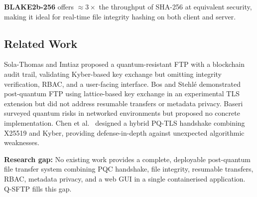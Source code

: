 \textbf{BLAKE2b-256} \cite{aumasson2013blake2} offers $\approx 3\times$
the throughput of SHA-256 at equivalent security, making it ideal for
real-time file integrity hashing on both client and server.

\subsection{Related Work}

Sola-Thomas and Imtiaz \cite{sola2025quantumftp} proposed a
quantum-resistant FTP with a blockchain audit trail, validating
Kyber-based key exchange but omitting integrity verification, RBAC,
and a user-facing interface. Bos and Stehl\'{e} \cite{bos2023pqftp}
demonstrated post-quantum FTP using lattice-based key exchange in an
experimental TLS extension but did not address resumable transfers or
metadata privacy. Baseri \cite{baseri2024navigating} surveyed quantum
risks in networked environments but proposed no concrete implementation.
Chen et al.\ \cite{chen2022hybridtls} designed a hybrid PQ-TLS
handshake combining X25519 and Kyber, providing defense-in-depth
against unexpected algorithmic weaknesses.

\textbf{Research gap:} No existing work provides a complete,
deployable post-quantum file transfer system combining PQC handshake,
file integrity, resumable transfers, RBAC, metadata privacy, and a
web GUI in a single containerised application. Q-SFTP fills this gap.

